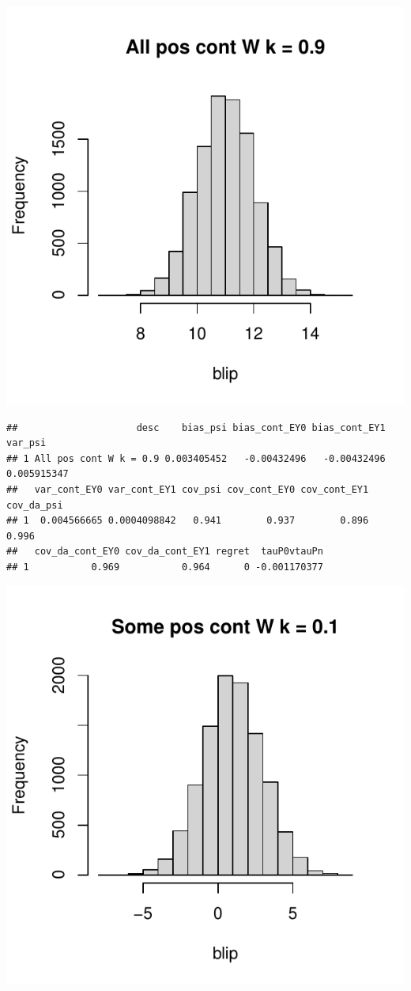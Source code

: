 \documentclass[11pt]{article}\usepackage[]{graphicx}\usepackage[table]{xcolor}
\makeatletter
\def\maxwidth{ %
  \ifdim\Gin@nat@width>\linewidth
    \linewidth
  \else
    \Gin@nat@width
  \fi
}
\newenvironment{kframe}{%
 \def\at@end@of@kframe{}%
 \ifinner\ifhmode%
  \def\at@end@of@kframe{\end{minipage}}%
  \begin{minipage}{\columnwidth}%
 \fi\fi%
 \def\FrameCommand##1{\hskip\@totalleftmargin \hskip-\fboxsep
 \colorbox{shadecolor}{##1}\hskip-\fboxsep
     \hskip-\linewidth \hskip-\@totalleftmargin \hskip\columnwidth}%
 \MakeFramed {\advance\hsize-\width
   \@totalleftmargin\z@ \linewidth\hsize
   \@setminipage}}%
 {\par\unskip\endMakeFramed%
 \at@end@of@kframe}
\newenvironment{knitrout}{}{} %
\makeatother
\begin{document}
\begin{knitrout}
\includegraphics[width=\maxwidth]{figure/unnamed-chunk-4-8} 
\begin{kframe}\begin{verbatim}
##                     desc    bias_psi bias_cont_EY0 bias_cont_EY1     var_psi
## 1 All pos cont W k = 0.9 0.003405452   -0.00432496   -0.00432496 0.005915347
##   var_cont_EY0 var_cont_EY1 cov_psi cov_cont_EY0 cov_cont_EY1 cov_da_psi
## 1  0.004566665 0.0004098842   0.941        0.937        0.896      0.996
##   cov_da_cont_EY0 cov_da_cont_EY1 regret  tauP0vtauPn
## 1           0.969           0.964      0 -0.001170377
\end{verbatim}
\end{kframe}
\includegraphics[width=\maxwidth]{figure/unnamed-chunk-4-9} 

\end{knitrout}
\end{document}
